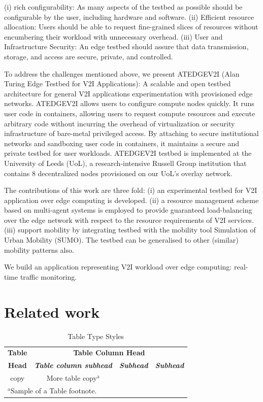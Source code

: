 \documentclass[conference]{IEEEtran}
\begin{document}
(i) rich configurability: As many aspects of the testbed as possible should be configurable by the user, including hardware and software. (ii) Efficient resource allocation: Users should be able to request fine-grained slices of resources without encumbering their workload with unnecessary overhead. (iii) User and Infrastructure Security: An edge testbed should assure that data transmission, storage, and access are secure, private, and controlled.
\par To address the challenges mentioned above, we present ATEDGEV2I (Alan Turing Edge Testbed for V2I Applications): A scalable and open testbed architecture for general V2I applications experimentation with provisioned edge networks. ATEDGEV2I allows users to configure compute nodes quickly. It runs user code in containers, allowing users to request compute resources and execute arbitrary code without incurring the overhead of virtualization or security infrastructure of bare-metal privileged access. By attaching to secure institutional networks and sandboxing user code in containers, it maintains a secure and private testbed for user workloads. ATEDGEV2I testbed is implemented at the University of Leeds (UoL), a research-intensive Russell Group institution that contains 8 decentralized nodes provisioned on our UoL's overlay network.
\par The contributions of this work are three fold: (i) an experimental testbed for V2I application over edge computing is developed. (ii) a resource management scheme based on multi-agent systems is employed to provide guaranteed load-balancing over the edge network with respect to the resource requirements of V2I services.
(iii) support mobility by integrating testbed with the mobility tool Simulation of Urban Mobility (SUMO)\cite{behrisch2011sumo}. The testbed can be generalised to other (similar) mobility patterns also.

We build an application representing V2I workload over edge computing: real-time traffic monitoring.

\section{Related work}
\begin{table}[htbp]
\caption{Table Type Styles}
\begin{center}
\begin{tabular}{|c|c|c|c|}
\hline
\textbf{Table}&\multicolumn{3}{|c|}{\textbf{Table Column Head}} \\
\cline{2-4} 
\textbf{Head} & \textbf{\textit{Table column subhead}}& \textbf{\textit{Subhead}}& \textbf{\textit{Subhead}} \\
\hline
copy& More table copy$^{\mathrm{a}}$& &  \\
\hline
\multicolumn{4}{l}{$^{\mathrm{a}}$Sample of a Table footnote.}
\end{tabular}
\label{tab1}
\end{center}
\end{table}
\end{document}
